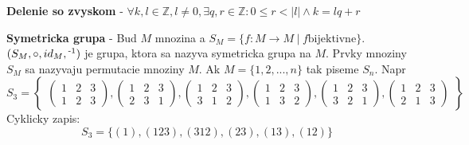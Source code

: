\documentclass[12pt]{article}
\newcommand{\pipesep}{\hspace{3pt} \vert \hspace{3pt}}
\begin{document}
\textbf{Delenie so zvyskom} - $\forall k,l \in \mathbb{Z}, l \not= 0, \exists q,r \in \mathbb{Z}:
0 \le r < \vert l \vert \land k = lq + r$

\textbf{Symetricka grupa} - Bud $M$ mnozina a $S_{M} = \{ f : M \to M \pipesep f \text{bijektivne} \}$.
$(S_{M}, \circ, id_{M}, \textsuperscript{-1})$ je grupa, ktora sa nazyva symetricka grupa na $M$.
Prvky mnoziny $S_{M}$ sa nazyvaju permutacie mnoziny $M$. Ak $M = \{1,2,...,n\}$ tak piseme $S_{n}$. Napr
\begin{equation*}
	S_{3} = \begin{Bmatrix}
	\begin{pmatrix}
		1 & 2 & 3 \\
		1 & 2 & 3
	\end{pmatrix},
	\begin{pmatrix}
		1 & 2 & 3 \\
		2 & 3 & 1
	\end{pmatrix},
	\begin{pmatrix}
		1 & 2 & 3 \\
		3 & 1 & 2
	\end{pmatrix},
	\begin{pmatrix}
		1 & 2 & 3 \\
		1 & 3 & 2
	\end{pmatrix},
	\begin{pmatrix}
		1 & 2 & 3 \\
		3 & 2 & 1
	\end{pmatrix},
	\begin{pmatrix}
		1 & 2 & 3 \\
		2 & 1 & 3
	\end{pmatrix}
	\end{Bmatrix}
\end{equation*}
Cyklicky zapis:
\begin{equation*}
	S_{3} = \{ (1), (123), (312), (23), (13), (12) \}
\end{equation*}
\end{document}
